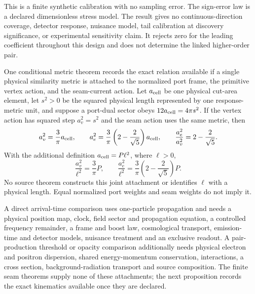 \documentclass[11pt]{article}
\theoremstyle{remark}
\theoremstyle{plain}
\begin{document}
This is a finite synthetic calibration with no sampling error. The sign-error
law is a declared dimensionless stress model. The result gives no
continuous-direction coverage, detector response, nuisance model, tail
calibration at discovery significance, or experimental sensitivity claim.
It rejects zero for the leading coefficient throughout this design and does
not determine the linked higher-order pair.

One conditional metric theorem records the exact relation available if a
single physical similarity metric is attached to the normalized port frame,
the primitive vertex action, and the seam-current action. Let \(a_{\rm cell}\)
be one physical cut-area element, let \(s^2>0\) be the squared physical length
represented by one response-metric unit, and suppose a port-dual sector obeys
\(12a_{\rm cell}=4\pi s^2\). If the vertex action has squared step \(a_v^2=s^2\)
and the seam action uses the same metric, then
\[
a_v^2=\frac3\pi a_{\rm cell},\qquad
a_e^2=\frac3\pi\left(2-\frac2{\sqrt5}\right)a_{\rm cell},\qquad
\frac{a_e^2}{a_v^2}=2-\frac2{\sqrt5}.
\]
With the additional definition \(a_{\rm cell}=P\ell^2\), where \(\ell>0\),
\[
\frac{a_v^2}{\ell^2}=\frac3\pi P,\qquad
\frac{a_e^2}{\ell^2}
=\frac3\pi\left(2-\frac2{\sqrt5}\right)P.
\]
No source theorem constructs this joint attachment or identifies \(\ell\)
with a physical length. Equal normalized port weights and seam weights do not
imply it.

A direct arrival-time comparison uses one-particle propagation and needs a
physical position map, clock, field sector and propagation equation, a
controlled frequency remainder, a frame and boost law, cosmological
transport, emission-time and detector models, nuisance treatment and an
exclusive readout. A pair-production threshold or opacity comparison
additionally needs physical electron and positron dispersion, shared
energy-momentum conservation, interactions, a cross section,
background-radiation transport and source composition. The finite seam
theorems supply none of these attachments; the next proposition records
the exact kinematics available once they are declared.
\end{document}
